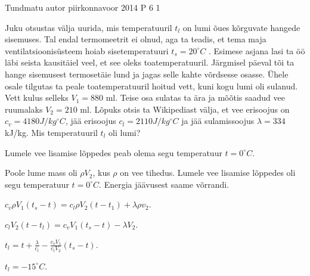 {Tundmatu autor} %
{piirkonnavoor} %
{2014} %
{P 6} %
{1} %
{

\ifStatement
Juku otsustas välja uurida, mis temperatuuril $t_l$ on lumi õues kõrguvate hangede sisemuses. Tal endal termomeetrit ei olnud, aga ta teadis, et tema maja ventilatsioonisüsteem hoiab sisetemperatuuri $t_s = 20 ^{\circ} C$ . Esimese asjana lasi ta öö läbi seista kausitäiel veel, et see oleks toatemperatuuril. Järgmisel päeval tõi ta hange sisemusest termosetäie lund ja jagas selle kahte võrdsesse osasse. Ühele osale tilgutas ta peale toatemperatuuril hoitud vett, kuni kogu lumi oli sulanud. Vett kulus selleks $V_1 = 880$ ml. Teise osa sulatas ta ära ja mõõtis saadud vee ruumalaks $V_2 = 210$ ml. Lõpuks otsis ta Wikipediast välja, et vee erisoojus on $c_v = 4180 J/kg^{\circ}C$, jää erisoojus $c_l = 2110 J/kg^{\circ}C$ ja jää sulamissoojus $\lambda = 334$ kJ/kg. Mis temperatuuril $t_l$ oli lumi?
\fi
 
 
\ifHint
Lumele vee lisamise lõppedes peab olema segu temperatuur $t = 0^{\circ}C$.
\fi



\ifSolution
Poole lume mass oli $\rho V_2$, kus $\rho$ on vee tihedus. Lumele vee lisamise lõppedes oli segu temperatuur $t = 0^{\circ}C$.
Energia jäävusest saame võrrandi.
\begin{center}
$c_v\rho V_1 (t_s - t) = c_l \rho V_2 (t -t_1) + \lambda \rho v_2$.
\end{center}
\begin{center}
$c_l V_2 (t - t_l) = c_v V_1 (t_s - t) - \lambda V_2$.
\end{center}
\begin{center}
$t_l = t + \frac{\lambda}{c_l} - \frac{c_v V_1}{c_l V_2}(t_s - t)$.
\end{center}
\begin{center}
$t_l = - 15^{\circ}C$.
\end{center}
\fi
}